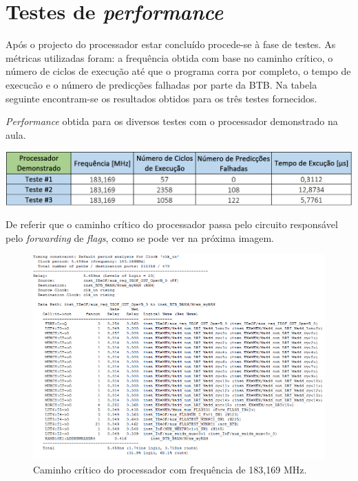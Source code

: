 \documentclass[11pt]{article}
\numberwithin{equation}{section}
\begin{document}

\section{Testes de \textit{performance}}

Após o projecto do processador estar concluído procede-se à fase de testes. As métricas utilizadas foram: a frequência obtida com base no caminho crítico, o número de ciclos de execução até que o programa corra por completo, o tempo de execucão e o número de predicções falhadas por parte da BTB. Na tabela seguinte encontram-se os resultados obtidos para os três testes fornecidos.

\begin{table}[H]
	\centering
	\caption{\textit{Performance} obtida para os diversos testes com o processador demonstrado na aula.}
	\vspace{-1.5mm}
	\includegraphics[keepaspectratio=true, scale=0.40]{tabelas/processadororiginal}
	\label{tab:processadororiginal}
\end{table}

De referir que o caminho crítico do processador passa pelo circuito responsável pelo \textit{forwarding} de \textit{flags}, como se pode ver na próxima imagem.

\begin{figure}[H]
	\centering
	\includegraphics[keepaspectratio=true, scale=0.35]{imagens/freq183}
	\vspace{-0.5em}
	\caption{Caminho crítico do processador com frequência de 183,169 MHz.}
	\label{fig:183}
	\vspace{-0.8em}
\end{figure} 
\end{document}
